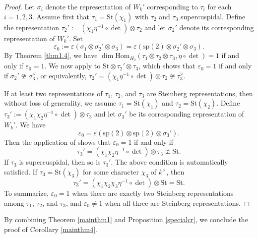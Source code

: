 \documentclass[12pt]{amsart}
\newcommand{\Hom}{{\mathrm{Hom}}}
\theoremstyle{Theorem}
\theoremstyle{Theorem}
\theoremstyle{Theorem}
\theoremstyle{Theorem}
\theoremstyle{Plain}
\theoremstyle{remark}
\theoremstyle{remark}
\theoremstyle{Definition}
\begin{document}
\begin{proof}
    Let $\sigma_i$ denote the representation of $W_k'$ corresponding to $\tau_i$ for each $ i = 1, 2, 3 $. Assume  first that $ \tau_1 = \mathrm{St} \left( \chi_1 \right) $ with $\tau_2$ and $\tau_3$ supercuspidal. Define the representation $ \tau_2' := \left( \chi_1 \eta^{-1} \circ \det \right) \otimes \tau_2 $ and let $\sigma_2'$ denote its corresponding representation of $W_k'$. Set
    \[
        \varepsilon_0 := \varepsilon \left( \sigma_1 \otimes \sigma_2' \otimes \sigma_3 \right) = \varepsilon \left( \mathrm{sp}(2) \otimes \sigma_2' \otimes \sigma_3 \right).
    \]
    By Theorem \ref{thm1.4}, we have $ \dim \Hom_{ H_0 } \left( \tau_1 \otimes \tau_2 \otimes \tau_3, \eta \circ \det \right) = 1 $ if and only if $ \varepsilon_0 = 1 $. We now apply \cite[Proposition 8.5]{Prasad} to $ \mathrm{St} \otimes \tau_2' \otimes \tau_3 $, which shows that $ \varepsilon_0 = 1 $ if and only if $ \sigma_2' \ncong \sigma_3^\vee $, or equivalently, $ \tau_2' = \left( \chi_1 \eta^{-1} \circ \det \right) \otimes \tau_2 \ncong \tau_3^\vee $.

    If at least two representations of $\tau_1$, $\tau_2$, and $\tau_3$ are Steinberg representations, then without loss of generality, we assume $ \tau_1 = \mathrm{St} \left( \chi_1 \right) $ and $ \tau_2 = \mathrm{St} \left( \chi_2 \right) $. Define $ \tau_3' := \left( \chi_1 \chi_2 \eta^{-1} \circ \det \right) \otimes \tau_3 $ and let $\sigma_3'$ be its corresponding representation of $W_k'$. We have
    \[
        \varepsilon_0 = \varepsilon \left( \mathrm{sp}(2) \otimes \mathrm{sp}(2) \otimes \sigma_3' \right).
    \]
    Then the application of \cite[Proposition 8.6]{Prasad} shows that $ \varepsilon_0 = 1 $ if and only if 
    \[
        \tau_3' = \left( \chi_1 \chi_2 \eta^{-1} \circ \det \right) \otimes \tau_3 \ncong \mathrm{St}.
    \]
    If $\tau_3$ is supercuspidal, then so is $\tau_3'$. The above condition is automatically satisfied. If $ \tau_3 = \mathrm{St} \left( \chi_3 \right) $ for some character $\chi_3$ of $k^\times$, then
    \[
        \tau_3' = \left( \chi_1 \chi_2 \chi_3 \eta^{-1} \circ \det \right) \otimes \mathrm{St} = \mathrm{St}.
    \]
    To summarize, $ \varepsilon_0 = 1 $ when there are exactly two Steinberg representations among $\tau_1$, $\tau_2$, and $\tau_3$, and $ \varepsilon_0 \ne 1 $ when all three are Steinberg representations.
\end{proof}
    
By combining Theorem \ref{mainthm1} and Proposition \ref{specialcr}, we conclude the proof of Corollary \ref{mainthm4}.
\end{document}
